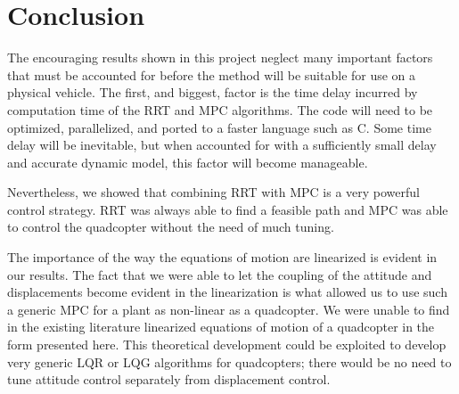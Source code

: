 \section{Conclusion}

The encouraging results shown in this project neglect many important factors that must be accounted for before the method will be suitable for use on a physical vehicle.  The first, and biggest, factor is the time delay incurred by computation time of the RRT and MPC algorithms.  The code will need to be optimized, parallelized, and ported to a faster language such as C.  Some time delay will be inevitable, but when accounted for with a sufficiently small delay and accurate dynamic model, this factor will become manageable.  

Nevertheless, we showed that combining RRT with MPC is a very powerful control strategy. RRT was always able to find a feasible path and MPC was able to control the quadcopter without the need of much tuning.

The importance of the way the equations of motion are linearized is evident in our results. The fact that we were able to let the coupling of the attitude and displacements become evident in the linearization is what allowed us to use such a generic MPC for a plant as non-linear as a quadcopter. We were unable to find in the existing literature linearized equations of motion of a quadcopter in the form presented here. This theoretical development could be exploited to develop very generic LQR or LQG algorithms for quadcopters; there would be no need to tune attitude control separately from displacement control.